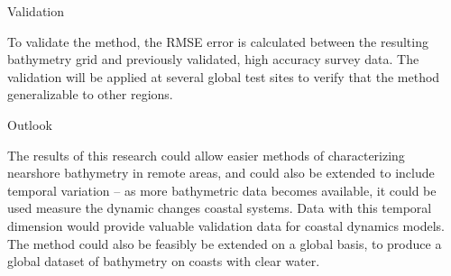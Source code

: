Validation

To validate the method, the RMSE error is calculated between the resulting bathymetry grid and previously validated, high accuracy survey data. The validation will be applied at several global test sites to verify that the method generalizable to other regions.

Outlook 

The results of this research could allow easier methods of characterizing nearshore bathymetry in remote areas, and could also be extended to include temporal variation – as more bathymetric data becomes available, it could be used measure the dynamic changes coastal systems. Data with this temporal dimension would provide valuable validation data for coastal dynamics models. The method could also be feasibly be extended on a global basis, to produce a global dataset of bathymetry on coasts with clear water.
